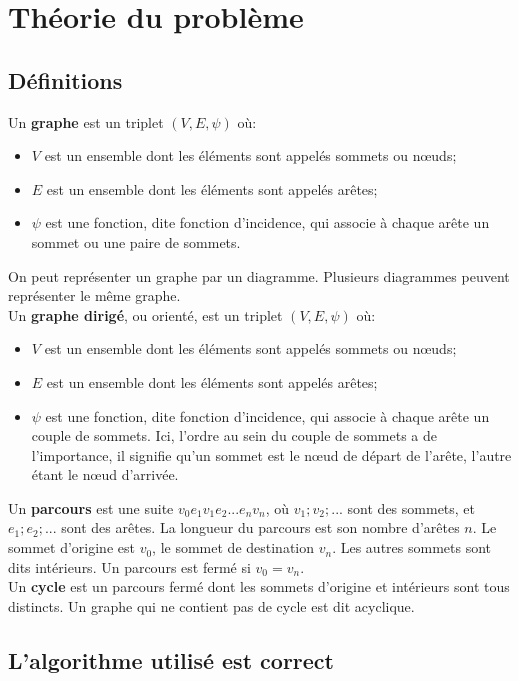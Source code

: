 \section{Théorie du problème}

\subsection{Définitions}
Un \textbf{graphe} est un triplet $(V,E,\psi)$ où:
\begin{itemize}
\item $V$ est un ensemble dont les éléments sont appelés sommets ou nœuds;
\item $E$ est un ensemble dont les éléments sont appelés arêtes;
\item $\psi$ est une fonction, dite fonction d'incidence, qui associe à chaque arête un sommet ou une paire de sommets.
\end{itemize}
On peut représenter un graphe par un diagramme. Plusieurs diagrammes peuvent représenter le même graphe.\\

Un \textbf{graphe dirigé}, ou orienté, est un triplet $(V,E,\psi)$ où:
\begin{itemize}
\item $V$ est un ensemble dont les éléments sont appelés sommets ou nœuds;
\item $E$ est un ensemble dont les éléments sont appelés arêtes;
\item $\psi$ est une fonction, dite fonction d'incidence, qui associe à chaque arête un couple de sommets. Ici, l'ordre au sein du couple de sommets a de l'importance, il signifie qu'un sommet est le nœud de départ de l'arête, l'autre étant le nœud d'arrivée.\\
\end{itemize}

Un \textbf{parcours} est une suite $v_0e_1v_1e_2...e_nv_n$, où $v_1;v_2;...$ sont des sommets, et $e_1;e_2;...$ sont des arêtes. La longueur du parcours est son nombre d'arêtes $n$. Le sommet d'origine est $v_0$, le sommet de destination $v_n$. Les autres sommets sont dits intérieurs. Un parcours est fermé si $v_0 = v_n$.\\


Un \textbf{cycle} est un parcours fermé dont les sommets d'origine et intérieurs sont tous distincts. Un graphe qui ne contient pas de cycle est dit acyclique.

\subsection{L'algorithme utilisé est correct}
